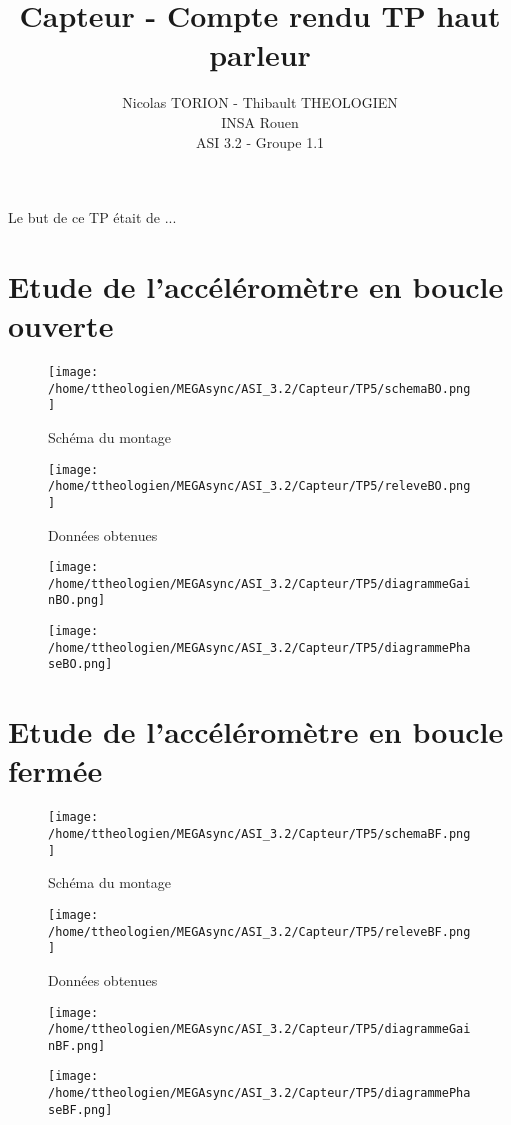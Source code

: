 \documentclass[a4paper,12pt]{article}
\title{Capteur - Compte rendu TP haut parleur}
\author{
	Nicolas TORION - Thibault THEOLOGIEN\\
	INSA Rouen\\
	ASI 3.2 - Groupe 1.1
}
\begin{document}
	\maketitle
	\tableofcontents
	\newpage

  \par Le but de ce TP était de ...

	\section{Etude de l'accéléromètre en boucle ouverte}
	\label{sec:Etude de l'accéléromètre en boucle ouverte}
		\begin{figure}[h]
			\caption{Schéma du montage}
			\centering
			\texttt{[image: /home/ttheologien/MEGAsync/ASI\_3.2/Capteur/TP5/schemaBO.png]}
		\end{figure}

		\begin{figure}[h]
			\caption{Données obtenues}
			\centering
			\texttt{[image: /home/ttheologien/MEGAsync/ASI\_3.2/Capteur/TP5/releveBO.png]}
		\end{figure}

		\begin{figure}[h]
			\centering
			\texttt{[image: /home/ttheologien/MEGAsync/ASI\_3.2/Capteur/TP5/diagrammeGainBO.png]}
		\end{figure}

		\begin{figure}[h]
			\centering
			\texttt{[image: /home/ttheologien/MEGAsync/ASI\_3.2/Capteur/TP5/diagrammePhaseBO.png]}
		\end{figure}

	\pagebreak

	\section{Etude de l'accéléromètre en boucle fermée}
	\label{sec:Etude de l'accéléromètre en boucle fermée}
		\begin{figure}[h]
			\caption{Schéma du montage}
			\centering
			\texttt{[image: /home/ttheologien/MEGAsync/ASI\_3.2/Capteur/TP5/schemaBF.png]}
		\end{figure}

		\begin{figure}[h]
			\caption{Données obtenues}
			\centering
			\texttt{[image: /home/ttheologien/MEGAsync/ASI\_3.2/Capteur/TP5/releveBF.png]}
		\end{figure}

		\begin{figure}[h]
			\centering
			\texttt{[image: /home/ttheologien/MEGAsync/ASI\_3.2/Capteur/TP5/diagrammeGainBF.png]}
		\end{figure}

		\begin{figure}[h]
			\centering
			\texttt{[image: /home/ttheologien/MEGAsync/ASI\_3.2/Capteur/TP5/diagrammePhaseBF.png]}
		\end{figure}
\end{document}
